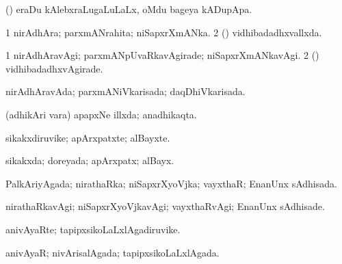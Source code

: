 {\bentry
{} 
\gl{\nA}
\expl{}
\bmng
(\pArxvi) eraDu kAlebxraLugaLuLaLx, oMdu bageya kADupApa. 
\emng
\eentry

\bentry
{} 
\gl{\gu}
\expl{}
\bmng
\bnum
\num{1} nirAdhAra; parxmANrahita; niSapxrXmANka. 
\num{2} (\nAyxshA) vidhibadadhxvallxda. 
\enum
\emng
\eentry

\bentry
{} 
\gl{\kirxvi}
\expl{}
\bmng
\bnum
\num{1} nirAdhAravAgi; parxmANpUvaRkavAgirade; niSapxrXmANkavAgi. 
\num{2} (\nAyxshA) vidhibadadhxvAgirade. 
\enum
\emng
\eentry

\bentry
{} 
\gl{\gu}
\expl{}
\bmng
nirAdhAravAda; parxmANiVkarisada; daqDhiVkarisada. 
\emng
\eentry

\bentry
{} 
\gl{\gu}
\expl{}
\bmng
(adhikAri \mo vara) apapxNe illxda; anadhikaqta. 
\emng
\eentry

\bentry
{} 
\gl{\gu}
\bmng
{} 
\emng
\eentry

\bentry
{} 
\gl{\nA}
\expl{}
\bmng
sikakxdiruvike; apArxpatxte; alBayxte. 
\emng
\eentry

\bentry
{} 
\gl{\gu}
\expl{}
\bmng
sikakxda; doreyada; apArxpatx; alBayx. 
\emng
\eentry

\bentry
{} 
\gl{\nA}
\expl{}
\bmng
{} 
\emng
\eentry

\bentry
{} 
\gl{\gu}
\expl{}
\bmng
PalkAriyAgada; nirathaRka; niSapxrXyoVjka; vayxthaR; EnanUnx sAdhisada. 
\emng
\eentry

\bentry
{} 
\gl{\kirxvi}
\expl{}
\bmng
nirathaRkavAgi; niSapxrXyoVjkavAgi; vayxthaRvAgi; EnanUnx sAdhisade. 
\emng
\eentry

\bentry
{} 
\gl{\nA}
\expl{}
\bmng
anivAyaRte; tapipxsikoLaLxlAgadiruvike. 
\emng
\eentry

\bentry
{} 
\gl{\gu}
\expl{}
\bmng
anivAyaR; nivArisalAgada; tapipxsikoLaLxlAgada. 
\emng
\eentry

\bentry
{} 
\gl{\nA}
\expl{}
\bmng
{} 
\emng
\eentry

}
